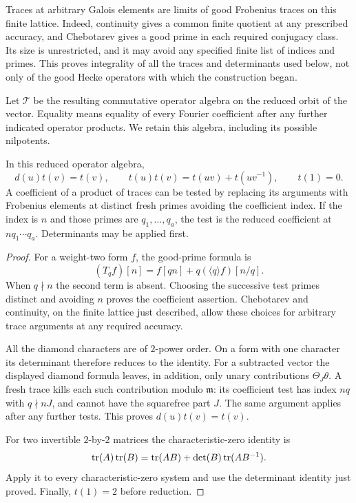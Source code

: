 Traces at arbitrary Galois elements are limits of good Frobenius traces
on this finite lattice.  Indeed, continuity gives a common finite
quotient at any prescribed accuracy, and Chebotarev gives a good prime
in each required conjugacy class.  Its size is unrestricted, and it may
avoid any specified finite list of indices and primes.  This proves
integrality of all the traces and determinants used below, not only of
the good Hecke operators with which the construction began.

Let $\mathcal T$ be the resulting commutative operator algebra on the
reduced orbit of the vector. Equality means equality of every Fourier
coefficient after any further indicated operator products. We retain
this algebra, including its possible nilpotents.

\begin{lemma}
\label{tc:trace-algebra}\label{co:traces}
In this reduced operator algebra,
\begin{equation}
 d(u)t(v)=t(v),\qquad
 t(u)t(v)=t(uv)+t(uv^{-1}),\qquad t(1)=0.
 \label{tc:trace-identities}
\end{equation}
A coefficient of a product of traces can be tested by replacing its
arguments with Frobenius elements at distinct fresh primes avoiding
the coefficient index.  If the index is $n$ and those primes are
$q_1,\ldots,q_a$, the test is the reduced coefficient at
$nq_1\cdots q_a$.  Determinants may be applied first.
\end{lemma}

\begin{proof}
For a weight-two form $f$, the good-prime formula is
\[
                  (T_qf)[n]=f[qn]+q(\langle q\rangle f)[n/q].
\]
When $q\nmid n$ the second term is absent.  Choosing the successive
test primes distinct and avoiding $n$ proves the coefficient assertion.
Chebotarev and continuity, on the finite lattice just described, allow
these choices for arbitrary trace arguments at any required accuracy.

All the diamond characters are of $2$-power order.  On a form with one
character its determinant therefore reduces to the identity.  For a
subtracted vector the displayed diamond formula leaves, in addition,
only unary contributions $\Theta_J\theta$.  A fresh trace kills each
such contribution modulo $\mathfrak m$: its coefficient test has
index $nq$ with $q\nmid nJ$, and cannot have the squarefree part $J$.
The same argument applies after any further tests.  This proves
$d(u)t(v)=t(v)$.

For two invertible $2$-by-$2$ matrices the characteristic-zero identity
is
\[
 \operatorname{tr}(A)\operatorname{tr}(B)=\operatorname{tr}(AB)+\det(B)\operatorname{tr}(AB^{-1}).
\]
Apply it to every characteristic-zero system and use the determinant
identity just proved.  Finally, $t(1)=2$ before reduction.
\end{proof}

